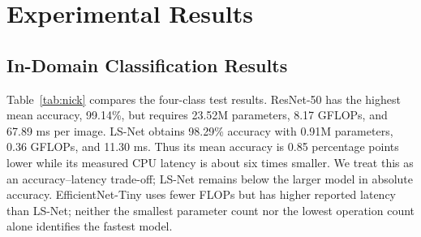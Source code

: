 \section{Experimental Results}
\subsection{In-Domain Classification Results}
Table~\ref{tab:nick} compares the four-class test results. ResNet-50 has the highest mean accuracy, 99.14\%, but requires 23.52M parameters, 8.17 GFLOPs, and 67.89 ms per image. LS-Net obtains 98.29\% accuracy with 0.91M parameters, 0.36 GFLOPs, and 11.30 ms. Thus its mean accuracy is 0.85 percentage points lower while its measured CPU latency is about six times smaller. We treat this as an accuracy--latency trade-off; LS-Net remains below the larger model in absolute accuracy. EfficientNet-Tiny uses fewer FLOPs but has higher reported latency than LS-Net; neither the smallest parameter count nor the lowest operation count alone identifies the fastest model.

